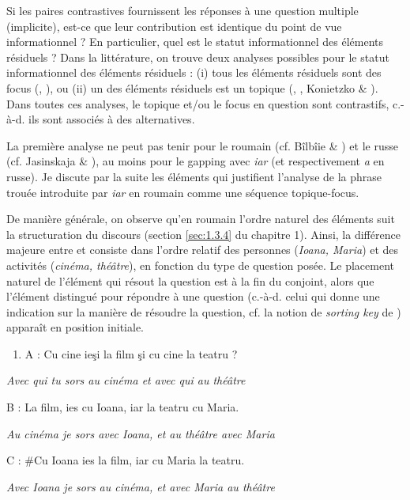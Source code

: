Si les paires contrastives fournissent les réponses à une question multiple (implicite), est-ce que leur contribution est identique du point de vue informationnel ? En particulier, quel est le statut informationnel des éléments résiduels ? Dans la littérature, on trouve deux analyses possibles pour le statut informationnel des éléments résiduels : (i) tous les éléments résiduels sont des focus (\citet{Kuno1976}, \citet{Hartmann2000}), ou (ii) un des éléments résiduels est un topique (\citet{Winkler2005}, \citet{Repp2009}, Konietzko \& \citet{Winkler2010}). Dans toutes ces analyses, le topique et/ou le focus en question sont contrastifs, c.-à-d. ils sont associés à des alternatives.

La première analyse ne peut pas tenir pour le roumain (cf. Bîlbîie \& \citet{Winterstein2011}) et le russe (cf. Jasinskaja \& \citet{Zeevat2009}), au moins pour le gapping avec \textit{iar} (et respectivement \textit{a} en russe). Je discute par la suite les éléments qui justifient l'analyse de la phrase trouée introduite par \textit{iar} en roumain comme une séquence topique-focus.

De manière générale, on observe qu'en roumain l'ordre naturel des éléments suit la structuration du discours (section \ref{sec:1.3.4} du chapitre 1). Ainsi, la différence majeure entre  et  consiste dans l'ordre relatif des personnes (\textit{Ioana, Maria}) et des activités (\textit{cinéma, théâtre}), en fonction du type de question posée. Le placement naturel de l'élément qui résout la question est à la fin du conjoint, alors que l'élément distingué pour répondre à une question (c.-à-d. celui qui donne une indication sur la manière de résoudre la question, cf. la notion de \textit{sorting key} de \citet{Kuno1982}) apparaît en position initiale.  


\begin{enumerate}
\item \label{bkm:Ref289643790}A :  Cu cine ieşi la film şi cu cine la teatru ?


\end{enumerate}
{\itshape
Avec qui tu sors au cinéma et avec qui au théâtre}

  B :  La film, ies cu Ioana, iar la teatru cu Maria. 

{\itshape
Au cinéma je sors avec Ioana, et au théâtre avec Maria}

  C :  \#Cu Ioana ies la film, iar cu Maria la teatru. 

{\itshape
    Avec Ioana je sors au cinéma, et avec Maria au théâtre } 


